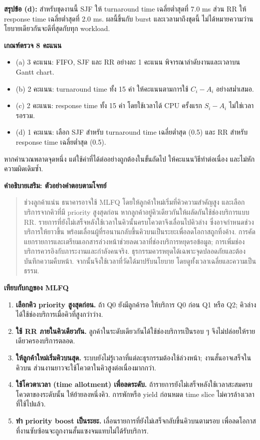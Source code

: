 \noindent\textbf{สรุปข้อ (d):} สำหรับชุดงานนี้ SJF ให้ turnaround time เฉลี่ยต่ำสุดที่ 7.0 ms ส่วน RR ให้ response time เฉลี่ยต่ำสุดที่ 2.0 ms. ผลนี้ขึ้นกับ burst และเวลามาถึงชุดนี้ ไม่ได้หมายความว่านโยบายเดียวกันจะดีที่สุดกับทุก workload.\par\medskip
\noindent\textbf{เกณฑ์ตรวจ 8 คะแนน}
\begin{itemize}[leftmargin=1.4em,itemsep=.14cm]
\item (a) 3 คะแนน: FIFO, SJF และ RR อย่างละ 1 คะแนน พิจารณาลำดับงานและเวลาบน Gantt chart.
\item (b) 2 คะแนน: turnaround time ทั้ง 15 ค่า ให้คะแนนตามการใช้ $C_i-A_i$ อย่างสม่ำเสมอ.
\item (c) 2 คะแนน: response time ทั้ง 15 ค่า โดยใช้เวลาได้ CPU ครั้งแรก $S_i-A_i$ ไม่ใช่เวลารอรวม.
\item (d) 1 คะแนน: เลือก SJF สำหรับ turnaround time เฉลี่ยต่ำสุด (0.5) และ RR สำหรับ response time เฉลี่ยต่ำสุด (0.5).
\end{itemize}
\noindent หากคำนวณพลาดจุดหนึ่ง แต่ใช้ค่าที่ได้ต่ออย่างถูกต้องในขั้นถัดไป ให้คะแนนวิธีทำต่อเนื่อง และไม่หักความผิดเดิมซ้ำ.\par
\newpage{}
\noindent\textbf{คำอธิบายเสริม: ตัวอย่างคำตอบตามโจทย์}
{\small\begin{quote}
ช่วงลูกค้าแน่น ธนาคารอาจใช้ MLFQ โดยให้ลูกค้าใหม่เริ่มที่คิวความสำคัญสูง และเลือกบริการจากคิวที่มี priority สูงสุดก่อน หากลูกค้าอยู่คิวเดียวกันให้ผลัดกันใช้ช่องบริการแบบ RR. รายการที่ยังไม่เสร็จหลังใช้เวลาในคิวนั้นครบโควตาจึงเลื่อนไปคิวล่าง ซึ่งอาจกำหนดช่วงบริการให้ยาวขึ้น พร้อมเลื่อนผู้ที่รอนานกลับขึ้นคิวบนเป็นระยะเพื่อลดโอกาสถูกทิ้งค้าง. การคัดแยกรายการและเตรียมเอกสารล่วงหน้าช่วยลดเวลาที่ช่องบริการหยุดรอข้อมูล; การเพิ่มช่องบริการควรอิงกับภาระงานและกำลังคนจริง. ธุรกรรมควรหยุดได้เฉพาะจุดปลอดภัยและต้องบันทึกความคืบหน้า. จากนั้นจึงใช้เวลาที่วัดได้มาปรับนโยบาย โดยดูทั้งเวลาเฉลี่ยและความเป็นธรรม.
\end{quote}}\medskip
\noindent\textbf{เทียบกับกฎของ MLFQ}
\begin{enumerate}[leftmargin=1.4em,itemsep=.18cm]
\item \textbf{เลือกคิว priority สูงสุดก่อน.} ถ้า Q0 ยังมีลูกค้ารอ ให้บริการ Q0 ก่อน Q1 หรือ Q2; คิวล่างได้ใช้ช่องบริการเมื่อคิวที่สูงกว่าว่าง.
\item \textbf{ใช้ RR ภายในคิวเดียวกัน.} ลูกค้าในระดับเดียวกันได้ใช้ช่องบริการเป็นรอบ ๆ จึงไม่ปล่อยให้รายเดียวครองบริการตลอด.
\item \textbf{ให้ลูกค้าใหม่เริ่มคิวบนสุด.} ระบบยังไม่รู้เวลาที่แต่ละธุรกรรมต้องใช้ล่วงหน้า; งานสั้นอาจเสร็จในคิวบน ส่วนงานยาวจะใช้โควตาในคิวสูงต่อเนื่องมากกว่า.
\item \textbf{ใช้โควตาเวลา (time allotment) เพื่อลดระดับ.} ถ้ารายการยังไม่เสร็จหลังใช้เวลาสะสมครบโควตาของระดับนั้น ให้ย้ายลงหนึ่งคิว. การพักหรือ yield ก่อนหมด time slice ไม่ควรล้างเวลาที่ใช้ไปแล้ว.
\item \textbf{ทำ priority boost เป็นระยะ.} เลื่อนรายการที่ยังไม่เสร็จกลับขึ้นคิวบนตามรอบ เพื่อลดโอกาสที่งานซับซ้อนจะถูกงานสั้นแซงจนแทบไม่ได้รับบริการ.
\end{enumerate}

